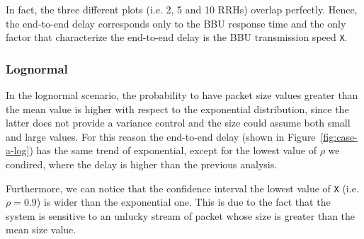 \documentclass[11pt,a4paper,oneside, openright]{article}
\begin{document}
In fact, the three different plots (i.e. 2, 5 and 10 RRHs) overlap perfectly.
Hence, the end-to-end delay corresponds only to the BBU response time and the only factor that characterize the end-to-end delay is the BBU transmission speed \texttt{X}.


\subsubsection{Lognormal}
In the lognormal scenario, the probability to have packet size values greater than the mean value is higher with respect to the exponential distribution, since the latter does not provide a variance control and the size could assume both small and large values. For this reason the end-to-end delay (shown in Figure~\ref{fig:case-a-log}) has the same trend of exponential, except for the lowest value of $ \rho $ we condired, where the delay is higher than the previous analysis.

Furthermore, we can notice that the confidence interval the lowest value of \texttt{X} (i.e. $\rho = 0.9$) is wider than the exponential one. This is due to the fact that the system is sensitive to an unlucky stream of packet whose size is greater than the mean size value.
\end{document}
